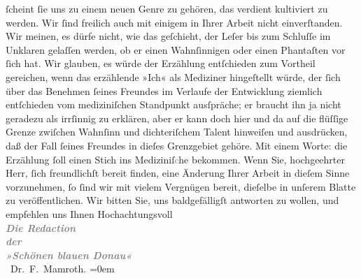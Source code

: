 \begin{ledgroupsized}[t]{13cm}
               ſcheint ſie uns zu einem neuen Genre zu gehören, das verdient kultiviert zu
               werden.\pend
           \pstart
           Wir ſind freilich auch mit einigem in Ihrer Arbeit nicht {\pb}einverſtanden.
               Wir meinen, es dürfe nicht, wie das geſchieht, der Leſer bis zum Schluſſe im Unklaren
               gelaſſen werden, ob er einen Wahnſinnigen oder einen Phantaſten vor ſich hat. Wir
               glauben, es würde der Erzählung entſchieden zum Vortheil gereichen, wenn das erzählende »Ich« als
               Mediziner hingeſtellt würde, der ſich über das Benehmen ſeines Freundes im Verlaufe
               der Entwicklung ziemlich entſchieden vom mediziniſchen Standpunkt ausſpräche; er
               braucht ihn ja nicht geradezu als irrſinnig zu erklären, aber er kann doch hier und
               da auf die flüſſige Grenze zwiſchen Wahnſinn und dichteriſchem Talent hinweiſen und
               ausdrücken, daß {\pb}der Fall ſeines Freundes in dieſes
               Grenzgebiet gehöre. Mit einem Worte: die Erzählung ſoll einen Stich ins
                  Mediziniſ\textcolor{gray}{c}he bekommen.\pend
           \pstart
           Wenn Sie, hochgeehrter Herr, ſich freundlichſt bereit finden, eine Änderung Ihrer Arbeit in dieſem Sinne
               vorzunehmen, ſo ſind wir mit vielem Vergnügen bereit, dieſelbe in unſerem Blatte zu veröffentlichen.\pend
           \pstart
           Wir bitten Sie, uns baldgefälligſt antworten zu wollen, und empfehlen {\pb}uns Ihnen\pend
           \pstart
           Hochachtungsvoll{\\[\baselineskip]}\textcolor{gray}{\textbf{\textit{Die Redaction}}}{\\[\baselineskip]}\textcolor{gray}{\textbf{\textit{der}}}{\\[\baselineskip]}\textcolor{gray}{\textbf{\textit{»Schönen blauen Donau«}}}{\\[\baselineskip]}\spacefill\mbox{\label{K_L02551-1v}\label{K_L02551-1h} Dr. F. Mamroth.}\pend
           \leftskip=0em{}
         
         \endnumbering{}\end{ledgroupsized}  \newcommand{\dateiname}{L02551}\newcommand{\titel}{Fedor Mamroth und Paul Goldmann an Arthur Schnitzler, 9. 12. 1888}\newcommand{\editorInnen}{Martin Anton Müller und Gerd-Hermann Susen}
      